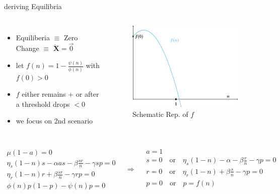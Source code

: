\documentclass{beamer}
\begin{document}
\begin{frame}[shrink=20]{deriving Equilibria}
  \begin{columns}
      \begin{itemize}
          \item Equiliberia $\equiv$ Zero Change $\equiv$  \( \dot{\mathbf{X}} = \vec{0} \)
          \item let \(f(n) = 1 - \frac{\psi(n)}{\phi(n)}\) with \(f(0)>0\)
          \item \(f\) either remains \(+\) or after a threshold drops \(< 0\)
          \item we focus on 2nd scenario
      \end{itemize}
      \begin{figure}
        \includegraphics[width=\textwidth]{1-s2.0-S1007570424005975-gr2.jpg}
        \caption{Schematic Rep. of \(f\) \cite{MOSTEFAOUI2025108412}}
      \end{figure}
  \end{columns}
  \vspace{-5mm}
  \[\begin{array}{l}
    \mu(1 - a)  = 0 \\
    \eta_s(1 - n)s - \alpha as - \beta \frac{sr}{n} - \gamma sp = 0 \\
    \eta_r(1 - n)r + \beta \frac{sr}{n} - \gamma rp = 0 \\
    \phi(n)p(1 - p) - \psi(n)p = 0 
  \end{array} \quad \Rightarrow \quad \begin{array}{l}
    a = 1 \\
    s = 0 \quad \text{or} \quad \eta_s(1-n) - \alpha - \beta\frac{r}{n} -\gamma p =0 \\
    r = 0 \quad \text{or} \quad \eta_r(1-n) + \beta\frac{s}{n} -\gamma p =0 \\
    p = 0 \quad \text{or} \quad p = f(n) \\
  \end{array} \]
\end{frame}
\end{document}
